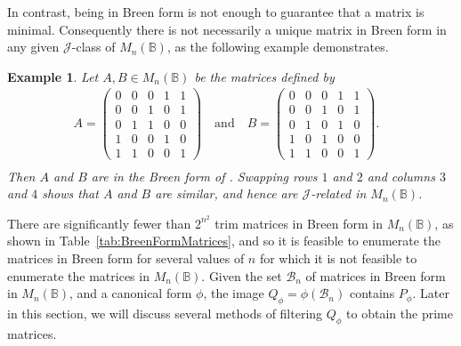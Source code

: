 \documentclass[11pt]{article}
\newtheorem{exa}[thm]{Example}
\newenvironment{ex}{\begin{exa}\rm}{\end{exa}}
\numberwithin{equation}{section}
\newcommand{\B}{\mathbb{B}}
\newcommand{\Bn}{M_n(\B)}
\newcommand{\J}{\mathscr{J}}
\begin{document}
In contrast, being in Breen form is not enough to guarantee that a matrix is
minimal. Consequently there is not necessarily a unique matrix in Breen form
in any given $\J$-class of $\Bn$, as the following example demonstrates. 
\begin{ex}
Let $A, B \in \Bn$ be the matrices defined by
\begin{align*}
  A = \begin{pmatrix}
    0 & 0 & 0 & 1 & 1 \\
    0 & 0 & 1 & 0 & 1 \\
    0 & 1 & 1 & 0 & 0 \\
    1 & 0 & 0 & 1 & 0 \\
    1 & 1 & 0 & 0 & 1 
  \end{pmatrix}\quad \text{and} \quad
  B = \begin{pmatrix}
    0 & 0 & 0 & 1 & 1 \\
    0 & 0 & 1 & 0 & 1 \\
    0 & 1 & 0 & 1 & 0 \\
    1 & 0 & 1 & 0 & 0 \\
    1 & 1 & 0 & 0 & 1 
  \end{pmatrix}.&\\
\end{align*}
Then $A$ and $B$ are in the Breen form of
. Swapping rows $1$ and $2$ and columns $3$
and $4$ shows that $A$ and $B$ are similar, and hence are $\J$-related in $\Bn$.
\end{ex}

There are significantly fewer than $2^{n^2}$ trim matrices in Breen form in $\Bn$,
as shown in Table~\ref{tab:BreenFormMatrices}, and so it is feasible to
enumerate the matrices in Breen form for several values of $n$ for which it
is not feasible to enumerate the matrices in $\Bn$.
Given the set $\mathcal{B}_n$ of matrices in Breen form in $\Bn$, and a canonical form
$\phi$, the image $Q_\phi = \phi(\mathcal{B}_n)$ contains $P_\phi$. Later in this section,
we will discuss several methods of filtering $Q_\phi$ to obtain the prime
matrices. 
\end{document}

